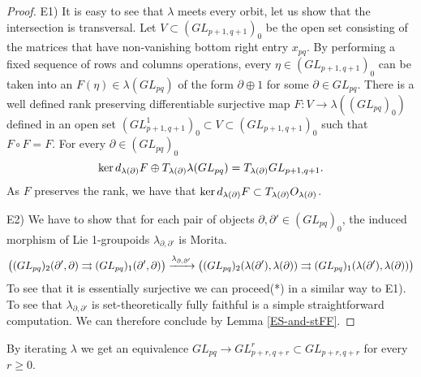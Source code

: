 \begin{proof}
E1)
It is easy to see that $\lambda$ meets every orbit, let us show that the intersection is transversal.
Let $V\subset (GL_{p+1,q+1})_0$ be the open set consisting of the matrices that have non-vanishing bottom right entry $x_{pq}$.
By performing a fixed sequence of rows and columns operations, every $\eta\in (GL_{p+1,q+1})_0$ can be taken into an $F(\eta)\in\lambda(GL_{pq})$ of the form $\partial\oplus 1$ for some $\partial\in GL_{pq}$.
There is a well defined rank preserving differentiable surjective map $F : V\to\lambda((GL_{pq})_0)$
defined in an open set $(GL^1_{p+1,q+1})_0\subset V \subset (GL_{p+1,q+1})_0$
such that $F\circ F = F$.
For every $\partial\in (GL_{pq})_0$
$$ \operatorname{ker} d_{\lambda(\partial)}F \oplus T_{\lambda(\partial)}\lambda(GL_{pq}) = T_{\lambda(\partial)}GL_{p+1,q+1} . $$
As $F$ preserves the rank, we have that $\operatorname{ker} d_{\lambda(\partial)}F \subset T_{\lambda(\partial)}O_{\lambda(\partial)}$.

E2)
We have to show that for each pair of objects $\partial,\partial'\in (GL_{pq})_0$, the induced morphism of Lie 1-groupoids $\lambda_{\partial, \partial'}$ is Morita.
$$\big( (GL_{pq})_2(\partial',\partial) \rightrightarrows (GL_{pq})_1(\partial',\partial) \big) \xrightarrow{\lambda_{\partial,\partial'}} \big( (GL_{pq})_2(\lambda(\partial'),\lambda(\partial)) \rightrightarrows (GL_{pq})_1(\lambda(\partial'),\lambda(\partial))  \big)$$
To see that it is essentially surjective we can proceed(*) in a similar way to E1).
To see that $\lambda_{\partial, \partial'}$ is set-theoretically fully faithful is a simple straightforward computation. We can therefore conclude by Lemma \ref{ES-and-stFF}.
\end{proof}

\begin{coro}
By iterating $\lambda$ we get an equivalence $GL_{pq}\to GL^r_{p+r,q+r} \subset GL_{p+r,q+r}$ for every $r\geq0$.
\end{coro}

